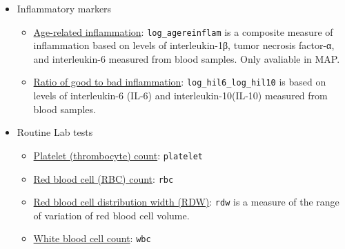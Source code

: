\documentclass[]{book}
\providecommand{\tightlist}{%
  \setlength{\itemsep}{0pt}\setlength{\parskip}{0pt}}
\begin{document}
\begin{itemize}
\tightlist
\item
  Inflammatory markers

  \begin{itemize}
  \tightlist
  \item
    \href{https://www.radc.rush.edu/docs/var/detail.htm?category=Blood+Measures\&subcategory=Inflammatory+markers\&variable=log_agereinflam}{Age-related inflammation}: \texttt{log\_agereinflam} is a composite measure of inflammation based on levels of interleukin-1β, tumor necrosis factor-α, and interleukin-6 measured from blood samples. Only avaliable in MAP.
  \item
    \href{https://www.radc.rush.edu/docs/var/detail.htm?category=Blood+Measures\&subcategory=Inflammatory+markers\&variable=log_hil6_log_hil10}{Ratio of good to bad inflammation}: \texttt{log\_hil6\_log\_hil10} is based on levels of interleukin-6 (IL-6) and interleukin-10(IL-10) measured from blood samples.
  \end{itemize}
\item
  Routine Lab tests

  \begin{itemize}
  \tightlist
  \item
    \href{https://www.radc.rush.edu/docs/var/detail.htm?category=Blood+Measures\&subcategory=Routine+laboratory+tests\&variable=platelet}{Platelet (thrombocyte) count}: \texttt{platelet}
  \item
    \href{https://www.radc.rush.edu/docs/var/detail.htm?category=Blood+Measures\&subcategory=Routine+laboratory+tests\&variable=rbc}{Red blood cell (RBC) count}: \texttt{rbc}
  \item
    \href{https://www.radc.rush.edu/docs/var/detail.htm?category=Blood+Measures\&subcategory=Routine+laboratory+tests\&variable=rdw}{Red blood cell distribution width (RDW)}: \texttt{rdw} is a measure of the range of variation of red blood cell volume.
  \item
    \href{https://www.radc.rush.edu/docs/var/detail.htm?category=Blood+Measures\&subcategory=Routine+laboratory+tests\&variable=wbc}{White blood cell count}: \texttt{wbc}
  \end{itemize}
\end{itemize}

\hypertarget{htmlwidget-c5674fe3b0da62c2e0f0}{}
\begin{datatables}

\end{datatables}
\end{document}
